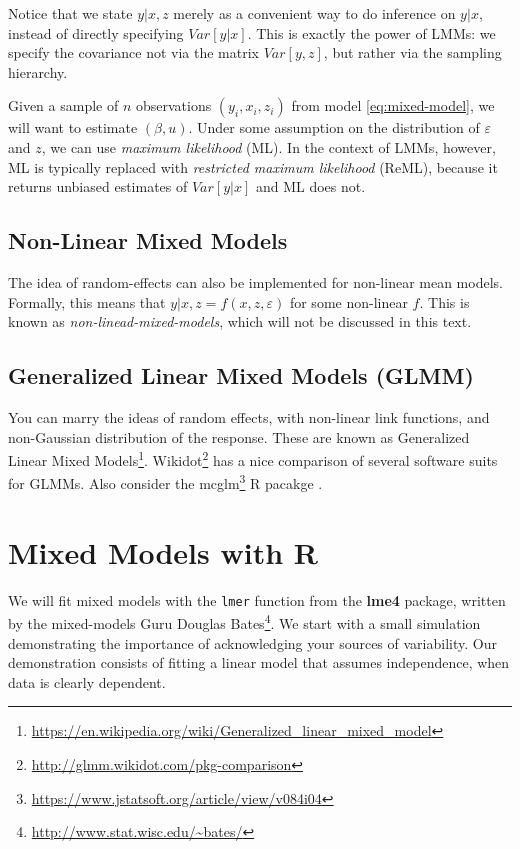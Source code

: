 \documentclass[]{book}
\renewcommand{\href}[2]{#2\footnote{\url{#1}}}
\theoremstyle{definition}
\theoremstyle{definition}
\theoremstyle{definition}
\theoremstyle{remark}
\begin{document}
Notice that we state \(y|x,z\) merely as a convenient way to do inference on \(y|x\), instead of directly specifying \(Var[y|x]\).
This is exactly the power of LMMs: we specify the covariance not via the matrix \(Var[y,z]\), but rather via the sampling hierarchy.

Given a sample of \(n\) observations \((y_i,x_i,z_i)\) from model \eqref{eq:mixed-model}, we will want to estimate \((\beta,u)\).
Under some assumption on the distribution of \(\varepsilon\) and \(z\), we can use \emph{maximum likelihood} (ML).
In the context of LMMs, however, ML is typically replaced with \emph{restricted maximum likelihood} (ReML), because it returns unbiased estimates of \(Var[y|x]\) and ML does not.

\hypertarget{non-linear-mixed-models}{%
\subsection{Non-Linear Mixed Models}\label{non-linear-mixed-models}}

The idea of random-effects can also be implemented for non-linear mean models. Formally, this means that \(y|x,z=f(x,z,\varepsilon)\) for some non-linear \(f\).
This is known as \emph{non-linead-mixed-models}, which will not be discussed in this text.

\hypertarget{generalized-linear-mixed-models-glmm}{%
\subsection{Generalized Linear Mixed Models (GLMM)}\label{generalized-linear-mixed-models-glmm}}

You can marry the ideas of random effects, with non-linear link functions, and non-Gaussian distribution of the response.
These are known as \href{https://en.wikipedia.org/wiki/Generalized_linear_mixed_model}{Generalized Linear Mixed Models}.
\href{http://glmm.wikidot.com/pkg-comparison}{Wikidot} has a nice comparison of several software suits for GLMMs.
Also consider the \href{https://www.jstatsoft.org/article/view/v084i04}{mcglm} R pacakge \citep{bonat2018multiple}.

\hypertarget{mixed-models-with-r}{%
\section{Mixed Models with R}\label{mixed-models-with-r}}

We will fit mixed models with the \texttt{lmer} function from the \textbf{lme4} package, written by the mixed-models Guru \href{http://www.stat.wisc.edu/~bates/}{Douglas Bates}.
We start with a small simulation demonstrating the importance of acknowledging your sources of variability. Our demonstration consists of fitting a linear model that assumes independence, when data is clearly dependent.
\end{document}
